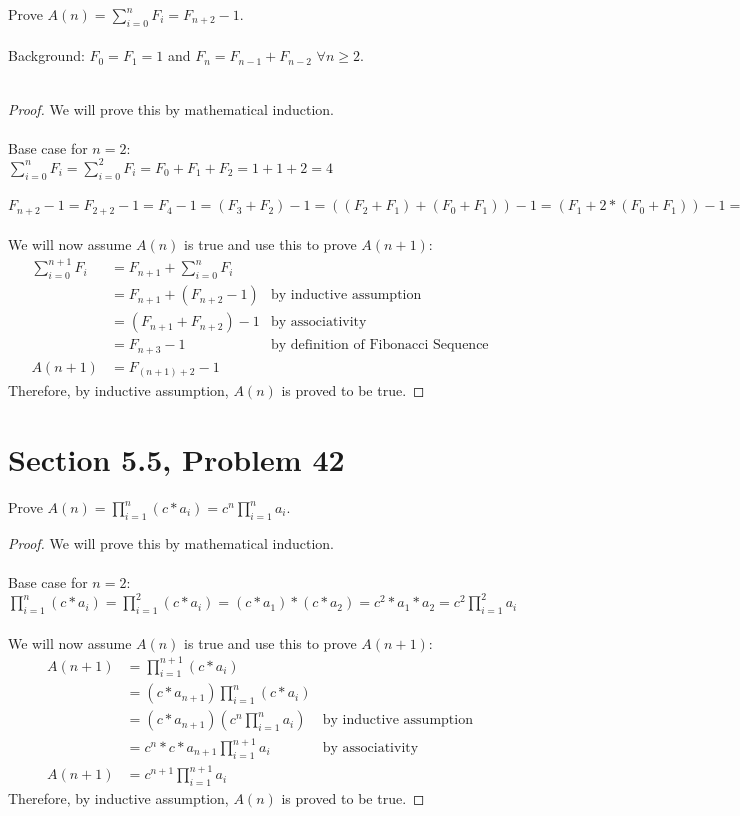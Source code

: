 \documentclass{article}
\author{Nathan Stouffer}
\begin{document}
Prove $A(n)=\sum\limits_{i=0}^n F_i = F_{n+2}-1$. \\\\
Background: $F_0=F_1=1$ and $F_n=F_{n-1}+F_{n-2}$ $\forall n \geq 2$. \\\\
\begin{proof}
	We will prove this by mathematical induction. \\\\
	Base case for $n=2$: \\
	$\sum\limits_{i=0}^n F_i =\sum\limits_{i=0}^2 F_i = F_0+F_1+F_2=1+1+2=4$ \\\\
	$F_{n+2}-1=F_{2+2}-1=F_4-1=(F_3+F_2)-1=((F_2+F_1)+(F_0+F_1))-1=(F_1+2*(F_0+F_1))-1=(1+2*(1+1))-1=(1+2*2)-1=4$ \\\\
	We will now assume $A(n)$ is true and use this to prove $A(n+1)$: \\
	\begin{align*}
		\sum\limits_{i=0}^{n+1}F_i&=F_{n+1}+\sum\limits_{i=0}^{n}F_i \\
		&=F_{n+1}+(F_{n+2}-1) &\text{by inductive assumption} \\
		&=(F_{n+1}+F_{n+2})-1 &\text{by associativity} \\
		&=F_{n+3}-1 &\text{by definition of Fibonacci Sequence} \\
		A(n+1)&=F_{(n+1)+2}-1
	\end{align*}
	Therefore, by inductive assumption, $A(n)$ is proved to be true.
\end{proof}

\clearpage
\header
\section*{Section 5.5, Problem 42}
Prove $A(n)=\prod\limits_{i=1}^n(c*a_i)=c^n\prod\limits_{i=1}^na_i$.
\begin{proof}
	We will prove this by mathematical induction. \\\\
	Base case for $n=2$: \\
	$\prod\limits_{i=1}^n(c*a_i)=\prod\limits_{i=1}^2(c*a_i)=(c*a_1)*(c*a_2)=c^2*a_1*a_2=c^2\prod\limits_{i=1}^2a_i$ \\\\
	We will now assume $A(n)$ is true and use this to prove $A(n+1)$: \\
	\begin{align*}
		A(n+1)&=\prod\limits_{i=1}^{n+1}(c*a_i) \\
		&=(c*a_{n+1})\prod\limits_{i=1}^n(c*a_i) \\
		&=(c*a_{n+1})(c^n\prod\limits_{i=1}^na_i) &\text{by inductive assumption} \\
		&=c^{n}*c*a_{n+1}\prod\limits_{i=1}^{n+1}a_i &\text{by associativity} \\
		A(n+1)&=c^{n+1}\prod\limits_{i=1}^{n+1}a_i
	\end{align*}
	Therefore, by inductive assumption, $A(n)$ is proved to be true.
\end{proof}
\end{document}
